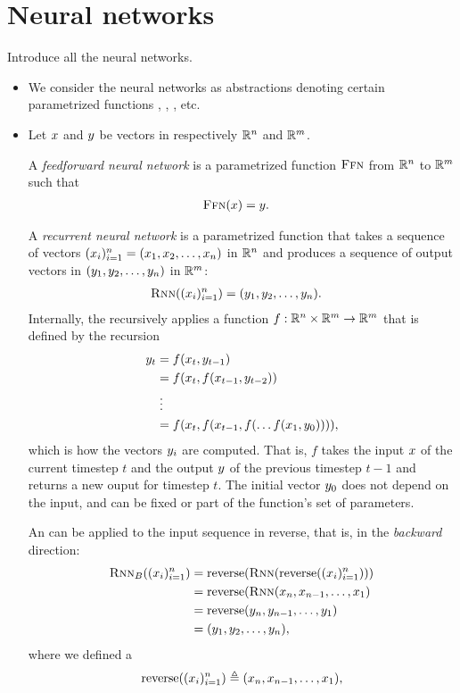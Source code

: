 \section{Neural networks}
Introduce all the neural networks.
\begin{itemize}
  \item We consider the neural networks as abstractions denoting certain parametrized functions \ff, \rnn, \lstm, etc.
  \item Let $x$ and $y$ be vectors in respectively $\mathbb{R}^{n}$ and $\mathbb{R}^{m}$.

  A \textit{feedforward neural network} is a parametrized function $\textsc{Ffn}$ from $\mathbb{R}^{n}$ to $\mathbb{R}^{m}$ such that
  \begin{align*}
    \textsc{Ffn}( x ) &= y.
  \end{align*}

  A \textit{recurrent neural network} is a parametrized function \rnn that takes a sequence of vectors $(x_i)_{i=1}^n = ( x_1, x_2, \dots, x_n )$ in $\mathbb{R}^{n}$ and produces a sequence of output vectors in $( y_1, y_2, \dots,y_n )$ in $\mathbb{R}^{m}$:
  \begin{align*}
    \textsc{Rnn}( (x_i)_{i=1}^n ) &= ( y_1, y_2, \dots, y_n ).
  \end{align*}
  Internally, the \rnn recursively applies a function $f: \mathbb{R}^{n} \times \mathbb{R}^{m} \to \mathbb{R}^{m}$ that is defined by the recursion
  \begin{align*}
    y_{t} &= f(x_t, y_{t-1})  \\
      &= f(x_t, f(x_{t-1}, y_{t-2}))  \\
      &\;\vdots \\
      &= f(x_t, f(x_{t-1}, f(\dots f(x_{1}, y_{0})))),
  \end{align*}
  which is how the vectors $y_i$ are computed. That is, $f$ takes the input $x$ of the current timestep $t$ and the output $y$ of the previous timestep $t-1$ and returns a new ouput for timestep $t$. The initial vector $y_{0}$ does not depend on the input, and can be fixed or part of the function's set of parameters.

  An \rnn can be applied to the input sequence in reverse, that is, in the \textit{backward} direction:
  \begin{align*}
    \textsc{Rnn}_B( (x_i)_{i=1}^n )
      &= \operatorname{\text{reverse}}( \textsc{Rnn}( \operatorname{\text{reverse}}( (x_i)_{i=1}^n ) ) ) \\
      &= \operatorname{\text{reverse}}( \textsc{Rnn}( x_n, x_{n-1}, \dots, x_1 ) \\
      &= \operatorname{\text{reverse}}( y_n, y_{n-1}, \dots, y_1 ) \\
      &= (y_1,y_2, \dots, y_n ), \\
  \end{align*}
  where we defined a
  \begin{equation}
    \operatorname{\text{reverse}}( (x_i)_{i=1}^n ) \triangleq ( x_n, x_{n-1}, \dots, x_1 ),
  \end{equation}


\end{itemize}
